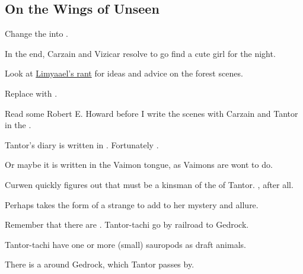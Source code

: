 \subsection{On the Wings of \Dragons Unseen}
\begin{changes}

  \begin{comment}
  \paragraph{Screaming in the Dark}
  \end{comment}
    Change the \scathae into \humans.
    
    In the end, Carzain and Vizicar resolve to go find a cute girl for the night. 
  
  \begin{comment}\paragraph{The Mystery of \EreshKal}\end{comment}
    Look at \href{http://limyaael.livejournal.com/167123.html}{Limyaael's  rant} for ideas and advice on the forest scenes. 
    
    Replace  with . 
    
    Read some Robert E. Howard before I write the scenes with Carzain and Tantor in the \wylde. 
    
    Tantor's diary is written in .
    Fortunately .
    
    Or maybe it is written in the Vaimon tongue, as Vaimons are wont to do.
    
    Curwen quickly figures out that  must be a kinsman of the \scarv{} of Tantor. 
    , after all.
    
    Perhaps \Takestsha takes the form of a strange  to add to her mystery and allure.
    
    Remember that there are . 
    Tantor-tachi go by railroad to Gedrock. 
    
    Tantor-tachi have one or more (small) sauropods as draft animals. 
    
    There is a  around Gedrock, which Tantor passes by. 
    

\end{changes}
